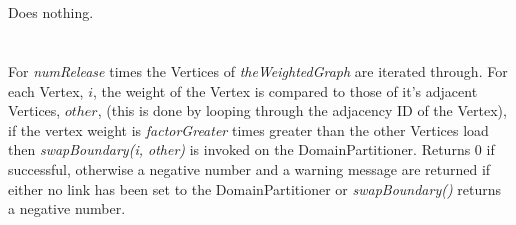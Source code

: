  \\
  \\ 
Does nothing. \\

 \\
 \\ 
For {\em numRelease} times the Vertices of {\em theWeightedGraph} are
iterated through. For each Vertex, $i$, the weight of the Vertex is compared
to those of it's adjacent Vertices, $other$, (this is done by looping through
the adjacency ID of the Vertex), if the vertex weight is {\em
factorGreater} times greater than the other Vertices load then {\em
swapBoundary(i, other)} is invoked on the DomainPartitioner. Returns
$0$ if successful, otherwise a negative number and a warning message
are returned if either no link has been set to the DomainPartitioner
or {\em swapBoundary()} returns a negative number. \\



